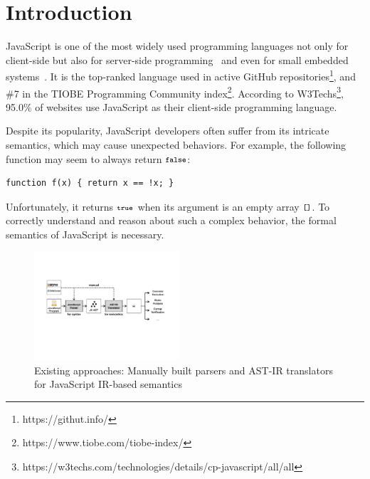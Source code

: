 \section{Introduction}
JavaScript is one of the most widely used programming languages not only for
client-side but also for server-side programming~\cite{nodejs, meanjs} and even
for small embedded systems~\cite{espruino, tessel2}.  It is the top-ranked
language used in active GitHub repositories\footnote{https://githut.info/}, and
\#7 in the TIOBE Programming Community
index\footnote{https://www.tiobe.com/tiobe-index/}.  According to
W3Techs\footnote{https://w3techs.com/technologies/details/cp-javascript/all/all},
95.0\% of websites use JavaScript as their client-side programming language.

Despite its popularity, JavaScript developers often suffer from its intricate
semantics, which may cause unexpected behaviors.  For example, the
following function may seem to always return \( \texttt{\footnotesize false} \):
\begin{lstlisting}[style=myJSstyle]
        function f(x) { return x == !x; }
\end{lstlisting}
Unfortunately, it returns \( \texttt{\footnotesize true} \) when its argument
is an empty array \( \texttt{\footnotesize[]} \).  To correctly understand and reason about
such a complex behavior, the formal semantics of JavaScript is necessary.

\begin{figure}
  \centering
  \includegraphics[width=0.48\textwidth]{img/existing.pdf}
\vspace*{-2em}
  \caption{Existing approaches: Manually built parsers and AST-IR
  translators for JavaScript IR-based semantics}
  \label{fig:existing}
\vspace*{-1em}
\end{figure}

